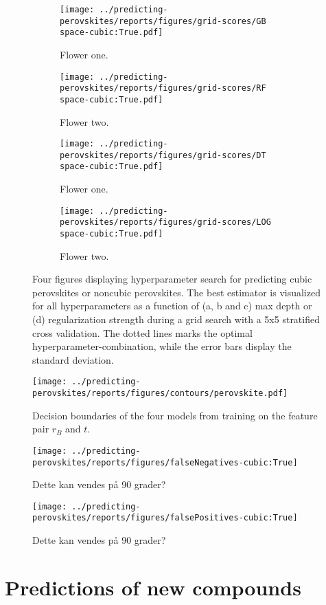 \clearpage

\begin{figure}[!tbp]
  \begin{subfigure}[b]{0.5\textwidth}
    \texttt{[image: ../predicting-perovskites/reports/figures/grid-scores/GB\\space-cubic:True.pdf]}
    \caption{Flower one.}
    \label{fig:h2-GB}
  \end{subfigure}%
  \hfill
  \begin{subfigure}[b]{0.5\textwidth}
    \texttt{[image: ../predicting-perovskites/reports/figures/grid-scores/RF\\space-cubic:True.pdf]}
    \caption{Flower two.}
    \label{fig:h2-RF}
  \end{subfigure}

  \begin{subfigure}[b]{0.5\textwidth}
    \texttt{[image: ../predicting-perovskites/reports/figures/grid-scores/DT\\space-cubic:True.pdf]}
    \caption{Flower one.}
    \label{fig:h2-DT}
  \end{subfigure}%
  \hfill
  \begin{subfigure}[b]{0.5\textwidth}
    \texttt{[image: ../predicting-perovskites/reports/figures/grid-scores/LOG\\space-cubic:True.pdf]}
    \caption{Flower two.}
    \label{fig:h2-LOG}
  \end{subfigure}
  \vspace*{-95mm}
  \caption{Four figures displaying hyperparameter search for predicting cubic perovskites or noncubic perovskites. The best estimator is visualized for all hyperparameters as a function of (a, b and c) max depth or (d) regularization strength during a grid search with a 5x5 stratified cross validation. The dotted lines marks the optimal hyperparameter-combination, while the error bars display the standard deviation. }
\end{figure}

\clearpage

\begin{figure}[!tbp]
  \centering
  \texttt{[image: ../predicting-perovskites/reports/figures/contours/perovskite.pdf]}
  \vspace*{-95mm}
  \caption{Decision boundaries of the four models from training on the feature pair $r_B$ and $t$.}
  \label{fig:decision-boundaries}
\end{figure}

\begin{figure}[!tbp]
  \texttt{[image: ../predicting-perovskites/reports/figures/falseNegatives-cubic:True]}
  \vspace*{-95mm}
  \caption{Dette kan vendes på 90 grader?}
  \label{fig:h2-fn}
\end{figure}

\begin{figure}[!tbp]
  \texttt{[image: ../predicting-perovskites/reports/figures/falsePositives-cubic:True]}
  \vspace*{-95mm}
  \caption{Dette kan vendes på 90 grader?}
  \label{fig:h2-fp}
\end{figure}



\section{Predictions of new compounds}
